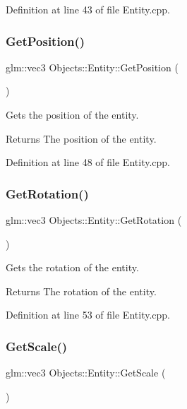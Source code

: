 Definition at line 43 of file Entity.\+cpp.

\mbox{\label{class_objects_1_1_entity_a5ee0431c29c1912dcd6c1607fa051b74}} 
\subsubsection{\texorpdfstring{Get\+Position()}{GetPosition()}}
{\footnotesize\ttfamily glm\+::vec3 Objects\+::\+Entity\+::\+Get\+Position (\begin{DoxyParamCaption}{ }\end{DoxyParamCaption})}

Gets the position of the entity. \begin{DoxyReturn}{Returns}
The position of the entity. 
\end{DoxyReturn}


Definition at line 48 of file Entity.\+cpp.

\mbox{\label{class_objects_1_1_entity_af859452e323ac3340ad7ac8f74bd6682}} 
\subsubsection{\texorpdfstring{Get\+Rotation()}{GetRotation()}}
{\footnotesize\ttfamily glm\+::vec3 Objects\+::\+Entity\+::\+Get\+Rotation (\begin{DoxyParamCaption}{ }\end{DoxyParamCaption})}

Gets the rotation of the entity. \begin{DoxyReturn}{Returns}
The rotation of the entity. 
\end{DoxyReturn}


Definition at line 53 of file Entity.\+cpp.

\mbox{\label{class_objects_1_1_entity_accdd401dc7d81b86f1c56e0eba8e515b}} 
\subsubsection{\texorpdfstring{Get\+Scale()}{GetScale()}}
{\footnotesize\ttfamily glm\+::vec3 Objects\+::\+Entity\+::\+Get\+Scale (\begin{DoxyParamCaption}{ }\end{DoxyParamCaption})}

